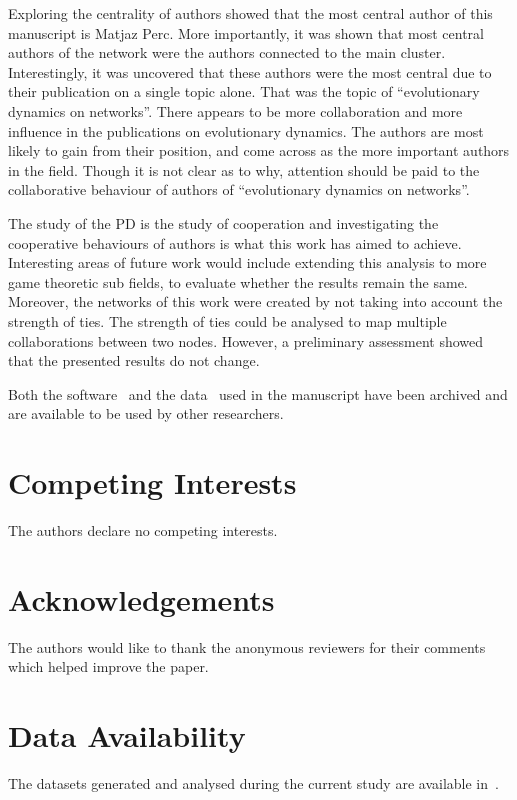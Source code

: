 \documentclass{article}
\theoremstyle{definition}
\begin{document}
Exploring the centrality of authors showed that the most central author of this
manuscript is Matjaz Perc. More importantly, it was shown that most central
authors of the network were the authors connected to the main cluster.
Interestingly, it was uncovered that these authors were the most central due to
their publication on a single topic alone. That was the topic of “evolutionary
dynamics on networks”. There appears to be more collaboration and more influence
in the publications on evolutionary dynamics. The authors are most likely to
gain from their position, and come across as the more important authors in the
field. Though it is not clear as to why, attention should be paid to the
collaborative behaviour of authors of “evolutionary dynamics on networks”.

The study of the PD is the study of cooperation and investigating the
cooperative behaviours of authors is what this work has aimed to achieve.
Interesting areas of future work would include extending this analysis to more
game theoretic sub fields, to evaluate whether the results remain the same.
Moreover, the networks of this work were created by not taking into account the
strength of ties. The strength of ties could be analysed to map multiple
collaborations between two nodes. However, a preliminary assessment showed that
the presented results do not change.

Both the software~\citep{nikoleta_2017} and the data~\citep{pd_data_2018} used in
the manuscript have been archived and are available to be used by other
researchers.

\section{Competing Interests}

The authors declare no competing interests.

\section{Acknowledgements}

The authors would like to thank the anonymous reviewers for their comments which
helped improve the paper.

\section{Data Availability}

The datasets generated and analysed during the current study are available
in~\citep{auction_data_2018, anarchy_data_2018, pd_data_2018}.
\end{document}
